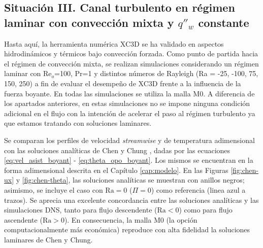 \subsection{Situación III. Canal turbulento en régimen laminar con convección mixta y $q''_w$ constante}

Hasta aquí, la herramienta numérica XC3D se ha validado en aspectos hidrodinámicos y térmicos bajo convección forzada. Como punto de partida hacia el régimen de convección mixta, se realizan simulaciones considerando un régimen laminar con Re$_o$=100, Pr=1 y distintos números de Rayleigh (Ra = -25, -100, 75, 150, 250) a fin de evaluar el desempeño de XC3D frente a la influencia de la fuerza boyante. En todas las simulaciones se utiliza la malla M0. A diferencia de los apartados anteriores, en estas simulaciones no se impone ninguna condición adicional en el flujo con la intención de acelerar el paso al régimen turbulento ya que estamos tratando con soluciones laminares.

Se comparan los perfiles de velocidad \textit{streamwise} y de temperatura adimensional con las soluciones analíticas de Chen y Chung \cite{chen1996linear}, dadas por las ecuaciones \ref{eq:vel_asist_boyant} - \ref{eq:theta_opo_boyant}. Los mismos se encuentran en la forma adimensional descrita en el Capítulo \ref{cap:modelo}. En las Figuras \ref{fig:chen-ux} y \ref{fig:chen-theta}, las soluciones analíticas se muestran con anillos negros; asimismo, se incluye el caso con $\text{Ra}=0$ ($\Pi=0$) como referencia (linea azul a trazos). Se aprecia una excelente concordancia entre las soluciones analíticas y las simulaciones DNS, tanto para flujo descendente ($\text{Ra}<0$) como para flujo ascendente ($\text{Ra}>0$). En consecuencia, la malla M0 (la opción computacionalmente más económica) reproduce con alta fidelidad la soluciones laminares de Chen y Chung. 

